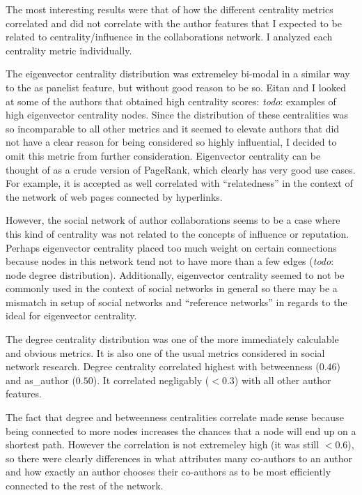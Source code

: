 \documentclass{article}
\newcommand{\todo}[1]{\textit{todo}: #1}
\begin{document}
The most interesting results were that of how the different centrality metrics correlated and did not correlate with the author features that I expected to be related to centrality/influence in the collaborations network.
I analyzed each centrality metric individually.

The eigenvector centrality distribution was extremeley bi-modal in a similar way to the as panelist feature, but without good reason to be so.
Eitan and I looked at some of the authors that obtained high centrality scores: \todo{examples of high eigenvector centrality nodes}.
Since the distribution of these centralities was so incomparable to all other metrics and it seemed to elevate authors that did not have a clear reason for being considered so highly influential, I decided to omit this metric from further consideration.
Eigenvector centrality can be thought of as a crude version of PageRank, which clearly has very good use cases.
For example, it is accepted as well correlated with ``relatedness'' in the context of the network of web pages connected by hyperlinks.

However, the social network of author collaborations seems to be a case where this kind of centrality was not related to the concepts of influence or reputation.
Perhaps eigenvector centrality placed too much weight on certain connections because nodes in this network tend not to have more than a few edges (\todo{node degree distribution}).
Additionally, eigenvector centrality seemed to not be commonly used in the context of social networks in general so there may be a mismatch in setup of social networks and ``reference networks'' in regards to the ideal for eigenvector centrality.


The degree centrality distribution was one of the more immediately calculable and obvious metrics.
It is also one of the usual metrics considered in social network research.
Degree centrality correlated highest with betweenness ($0.46$) and as\_author ($0.50$).
It correlated negligably ($< 0.3$) with all other author features.

The fact that degree and betweenness centralities correlate made sense because being connected to more nodes increases the chances that a node will end up on a shortest path.
However the correlation is not extremeley high (it was still $< 0.6$), so there were clearly differences in what attributes many co-authors to an author and how exactly an author chooses their co-authors as to be most efficiently connected to the rest of the network.
\end{document}
